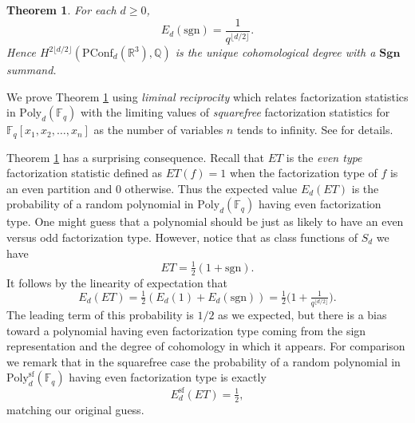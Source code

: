 \documentclass[submission]{FPSAC2018}
\newtheorem{thm}{Theorem}[section]
\theoremstyle{definition}
\numberwithin{equation}{section}
\def\QQ{\mathbb{Q}}
\def\FF{\mathbb{F}}
\def\RR{\mathbb{R}}
\newcommand\PConf{\mathrm{PConf}}
\def\sgn{\mathrm{sgn}}
\newcommand{\poly}{\mathrm{Poly}}
\newcommand{\sfr}{\mathrm{sf}}
\newcommand{\Sgn}{\mathbf{Sgn}}
\begin{document}
\begin{thm}
\label{thm sgn}
For each $d\geq 0$,
\[
    E_d(\sgn) = \frac{1}{q^{\lfloor d/2 \rfloor}}.
\]
Hence $H^{2\lfloor d/2 \rfloor}(\PConf_d(\RR^3),\QQ)$ is the unique cohomological degree with a $\Sgn$ summand.
\end{thm}

We prove Theorem \ref{thm sgn} using \emph{liminal reciprocity} which relates factorization statistics in $\poly_d(\FF_q)$ with the limiting values of \emph{squarefree} factorization statistics for $\FF_q[x_1, x_2, \ldots, x_n]$ as the number of variables $n$ tends to infinity. See \cite{Hyde2} for details.

Theorem \ref{thm sgn} has a surprising consequence. Recall that $ET$ is the \emph{even type} factorization statistic defined as $ET(f) = 1$ when the factorization type of $f$ is an even partition and 0 otherwise. Thus the expected value $E_d(ET)$ is the probability of a random polynomial in $\poly_d(\FF_q)$ having even factorization type. One might guess that a polynomial should be just as likely to have an even versus odd factorization type. However, notice that as class functions of $S_d$ we have
\[
    ET = \tfrac{1}{2}(1 + \sgn).
\]
It follows by the linearity of expectation that
\[
    E_d(ET) = \tfrac{1}{2}(E_d(1) + E_d(\sgn)) = \tfrac{1}{2}\big(1 + \tfrac{1}{q^{\lfloor d/2 \rfloor}}\big).
\]
The leading term of this probability is $1/2$ as we expected, but there is a bias toward a polynomial having even factorization type coming from the sign representation and the degree of cohomology in which it appears. For comparison we remark that in the squarefree case the probability of a random polynomial in $\poly_d^\sfr(\FF_q)$ having even factorization type is exactly
\[
    E_d^\sfr(ET) = \tfrac{1}{2},
\]
matching our original guess.
\end{document}
